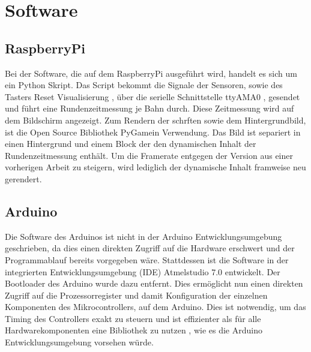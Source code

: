 \documentclass[a4paper, 11pt]{report}
\begin{document}
\chapter{Software}
	\section{RaspberryPi}

		Bei der Software, die auf dem RaspberryPi ausgeführt wird, handelt es sich um ein Python Skript.
		Das Script bekommt die Signale der Sensoren, sowie des Tasters \glqq Reset Visualisierung \grqq, über die serielle Schnittstelle \glqq ttyAMA0 \grqq, gesendet und führt eine Rundenzeitmessung je Bahn durch.
		Diese Zeitmessung wird auf dem Bildschirm angezeigt.
		Zum Rendern der schrften sowie dem Hintergrundbild, ist die Open Source Bibliothek \glqq PyGame\grqq in Verwendung.
		Das Bild ist separiert in einen Hintergrund und einem Block der den dynamischen Inhalt der Rundenzeitmessung enthält.
		Um die Framerate entgegen der Version aus einer vorherigen Arbeit zu steigern, wird lediglich der dynamische Inhalt framweise neu gerendert.
	\section{Arduino}
		Die Software des Arduinos ist nicht in der Arduino Entwicklungsumgebung geschrieben, da dies einen direkten Zugriff auf die Hardware erschwert und der Programmablauf bereits vorgegeben wäre.
		Stattdessen ist die Software in der integrierten Entwicklungsumgebung (IDE) \glqq Atmelstudio 7.0 \grqq entwickelt.
		Der Bootloader des Arduino wurde dazu entfernt.
		Dies ermöglicht nun einen direkten Zugriff auf die Prozessorregister und damit Konfiguration der einzelnen Komponenten des Mikrocontrollers, auf dem Arduino.
		Dies ist notwendig, um das Timing des Controllers exakt zu steuern und ist effizienter als für alle Hardwarekomponenten eine Bibliothek zu nutzen , wie es die Arduino Entwicklungsumgebung vorsehen würde.
\end{document}
